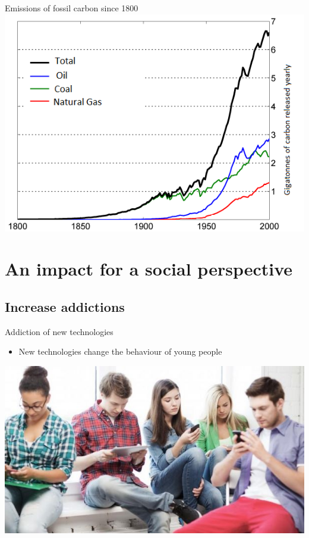 \documentclass{beamer}
\begin{document}
 \begin{frame}
\begin{block}{Emissions of fossil carbon since 1800} 
	\hspace{4cm}
	\includegraphics[scale=0.6]{pics/image5.png}
\end{block}
\end{frame}


\section{An impact for a social perspective}

\subsection{Increase addictions}

 \begin{frame}
\begin{block}{Addiction of new technologies} 
	\begin{itemize}
		[circle]
		\item New technologies change the behaviour of young people
	\end{itemize}
	\hspace{4cm}
	\includegraphics[scale=0.5]{pics/image6.jpg}
\end{block}
\end{frame}
\end{document}
